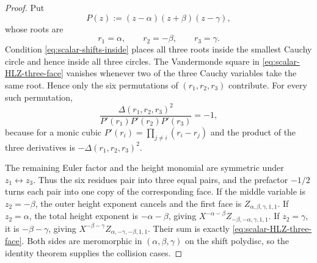 \begin{proof}
Put
\[
P(z):=(z-\alpha)(z+\beta)(z-\gamma),
\]
whose roots are
\[
r_1=\alpha,\qquad r_2=-\beta,\qquad r_3=\gamma.
\]
Condition \eqref{eq:scalar-shifts-inside} places all three roots inside the
smallest Cauchy circle and hence inside all three circles.
The Vandermonde square in \eqref{eq:scalar-HLZ-three-face} vanishes whenever two
of the three Cauchy variables take the same root.  Hence only the six
permutations of $(r_1,r_2,r_3)$ contribute.  For every such permutation,
\[
\frac{\Delta(r_1,r_2,r_3)^2}
     {P'(r_1)P'(r_2)P'(r_3)}=-1,
\]
because for a monic cubic
$P'(r_i)=\prod_{j\ne i}(r_i-r_j)$ and the product of the three derivatives is
$-\Delta(r_1,r_2,r_3)^2$.

The remaining Euler factor and the height monomial are symmetric under
$z_1\leftrightarrow z_3$.  Thus the six residues pair into three equal pairs,
and the prefactor $-1/2$ turns each pair into one copy of the corresponding
face.  If the middle variable is $z_2=-\beta$, the outer height exponent
cancels and the first face is $Z_{\alpha,\beta,\gamma,1,1}$.  If
$z_2=\alpha$, the total height exponent is $-\alpha-\beta$, giving
$X^{-\alpha-\beta}Z_{-\beta,-\alpha,\gamma,1,1}$.  If
$z_2=\gamma$, it is $-\beta-\gamma$, giving
$X^{-\beta-\gamma}Z_{\alpha,-\gamma,-\beta,1,1}$.  Their sum is exactly
\eqref{eq:scalar-HLZ-three-face}.
Both sides are meromorphic in $(\alpha,\beta,\gamma)$ on the shift polydisc,
so the identity theorem supplies the collision cases.
\end{proof}

